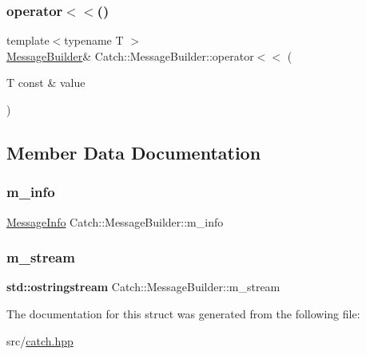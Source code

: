 \subsubsection{\texorpdfstring{operator$<$$<$()}{operator<<()}}
{\footnotesize\ttfamily template$<$typename T $>$ \\
\hyperlink{struct_catch_1_1_message_builder}{Message\+Builder}\& Catch\+::\+Message\+Builder\+::operator$<$$<$ (\begin{DoxyParamCaption}\item[{T const \&}]{value }\end{DoxyParamCaption})\hspace{0.3cm}{\ttfamily [inline]}}



\subsection{Member Data Documentation}
\mbox{\label{struct_catch_1_1_message_builder_a979f1c2b36d78f80ee275bfa5ba0209f}} 
\subsubsection{\texorpdfstring{m\+\_\+info}{m\_info}}
{\footnotesize\ttfamily \hyperlink{struct_catch_1_1_message_info}{Message\+Info} Catch\+::\+Message\+Builder\+::m\+\_\+info}

\mbox{\label{struct_catch_1_1_message_builder_a6488ab0cc4ea52affc9c0612c7c5df6b}} 
\subsubsection{\texorpdfstring{m\+\_\+stream}{m\_stream}}
{\footnotesize\ttfamily \textbf{ std\+::ostringstream} Catch\+::\+Message\+Builder\+::m\+\_\+stream}



The documentation for this struct was generated from the following file\+:\begin{DoxyCompactItemize}
\item 
src/\hyperlink{catch_8hpp}{catch.\+hpp}\end{DoxyCompactItemize}
